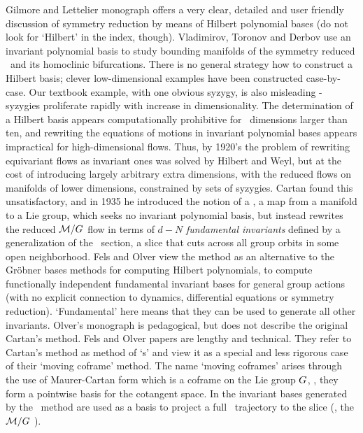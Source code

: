 \documentclass[12pt]{article}
\begin{document}
{Gilmore and Lettelier monograph offers a very clear,
detailed and user friendly discussion of symmetry reduction by means of
Hilbert polynomial bases (do not look for `Hilbert' in the index,
though).
Vladimirov, Toronov and Derbov use an invariant polynomial
basis to study bounding manifolds of the symmetry reduced \cLf\ and its
homoclinic bifurcations.
There is no general strategy how to construct a Hilbert basis;
clever low-dimensional examples have been constructed case-by-case.
Our textbook example, with one obvious
syzygy, is also misleading - syzygies proliferate
rapidly with increase in dimensionality.
The
determination of a Hilbert basis appears computationally
prohibitive for \statesp\ dimensions larger than
ten, and rewriting the equations
of motions in invariant polynomial bases appears impractical
for high-dimensional flows.
Thus, by 1920's the problem of rewriting equivariant
flows as invariant ones was solved by Hilbert and Weyl, but
at the cost of introducing largely arbitrary extra dimensions,
with the reduced flows on manifolds of lower
dimensions, constrained by sets of syzygies. Cartan
found this unsatisfactory, and in 1935 he introduced
the notion of a {\em \movframe}, a map from a manifold
to a Lie group, which seeks no invariant polynomial basis,
but instead rewrites the reduced $\mathcal{M}/G$ flow
in terms of $d-N$ {\em fundamental invariants} defined by
a generalization of the \Poincare\ section, a slice that
cuts across all group orbits in some open neighborhood. Fels
and Olver view the method as an alternative to the Gr\"obner
bases methods for computing Hilbert polynomials, to compute
functionally independent fundamental invariant bases for
general group actions (with no explicit connection to
dynamics, differential equations or symmetry reduction).
`Fundamental' here means that they can be used to generate
all other invariants. Olver's monograph is
pedagogical, but does not describe the original Cartan's
method. Fels and Olver papers are
lengthy and technical. They refer to Cartan's method as
method of `\movframe s' and view it as a special and less
rigorous case of their `moving coframe' method. The name
`moving coframes' arises through the use of Maurer-Cartan
form which is a coframe on the Lie group $G$, \ie, they
form a pointwise basis for the cotangent space. In
 the invariant bases generated
by the \movframe\ method are used as a basis to project a
full \statesp\ trajectory to the slice (\ie, the
$\mathcal{M}/G$ \reducedsp).

}
\end{document}
